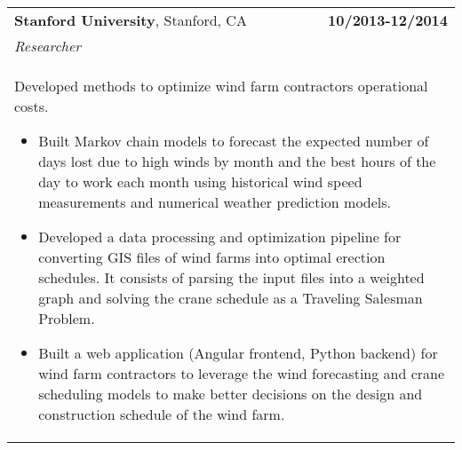 \documentclass[a4paper,10pt]{article}
\begin{document}
\begin{tabularx}{\textwidth}{Xr}
{\bf{Stanford University}}, Stanford, CA & \bf{10/2013-12/2014}\\
\emph{Researcher} &\\
\multicolumn{2}{p{0.98\textwidth}}{
Developed methods to optimize wind farm contractors operational costs.
\begin{itemize} 
	\item Built Markov chain models to forecast the expected number of days lost due to high winds by month and the best hours of the day to work each month using historical wind speed measurements and numerical weather prediction models.
	\item Developed a data processing and optimization pipeline for converting GIS files of wind farms into optimal erection schedules. It consists of parsing the input files into a weighted graph and solving the crane schedule as a Traveling Salesman Problem. 
	\item Built a web application (Angular frontend, Python backend) for wind farm contractors to leverage the wind forecasting and crane scheduling models to make better decisions on the design and construction schedule of the wind farm.
\end{itemize}
}\\





\end{tabularx}
\end{document}

